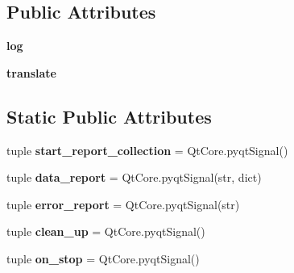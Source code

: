 \subsection*{Public Attributes}
\begin{DoxyCompactItemize}
\item 
\hypertarget{classcommotion__client_1_1extensions_1_1config__editor_1_1main_1_1ViewPort_a24d4aa0a151b0dca094f962f53936c73}{{\bfseries log}}\label{classcommotion__client_1_1extensions_1_1config__editor_1_1main_1_1ViewPort_a24d4aa0a151b0dca094f962f53936c73}

\item 
\hypertarget{classcommotion__client_1_1extensions_1_1config__editor_1_1main_1_1ViewPort_a83f08f61e1a063c32df35a7e1525951b}{{\bfseries translate}}\label{classcommotion__client_1_1extensions_1_1config__editor_1_1main_1_1ViewPort_a83f08f61e1a063c32df35a7e1525951b}

\end{DoxyCompactItemize}
\subsection*{Static Public Attributes}
\begin{DoxyCompactItemize}
\item 
\hypertarget{classcommotion__client_1_1extensions_1_1config__editor_1_1main_1_1ViewPort_a827b09211733037d237a251a8044ace2}{tuple {\bfseries start\-\_\-report\-\_\-collection} = Qt\-Core.\-pyqt\-Signal()}\label{classcommotion__client_1_1extensions_1_1config__editor_1_1main_1_1ViewPort_a827b09211733037d237a251a8044ace2}

\item 
\hypertarget{classcommotion__client_1_1extensions_1_1config__editor_1_1main_1_1ViewPort_acd90e59ae5c48843e70cacebfb578a29}{tuple {\bfseries data\-\_\-report} = Qt\-Core.\-pyqt\-Signal(str, dict)}\label{classcommotion__client_1_1extensions_1_1config__editor_1_1main_1_1ViewPort_acd90e59ae5c48843e70cacebfb578a29}

\item 
\hypertarget{classcommotion__client_1_1extensions_1_1config__editor_1_1main_1_1ViewPort_a56afd31e2d3659d6d6ac0b29368fe4a1}{tuple {\bfseries error\-\_\-report} = Qt\-Core.\-pyqt\-Signal(str)}\label{classcommotion__client_1_1extensions_1_1config__editor_1_1main_1_1ViewPort_a56afd31e2d3659d6d6ac0b29368fe4a1}

\item 
\hypertarget{classcommotion__client_1_1extensions_1_1config__editor_1_1main_1_1ViewPort_a90efecc3e2b13cfd791b7b5b2a48454a}{tuple {\bfseries clean\-\_\-up} = Qt\-Core.\-pyqt\-Signal()}\label{classcommotion__client_1_1extensions_1_1config__editor_1_1main_1_1ViewPort_a90efecc3e2b13cfd791b7b5b2a48454a}

\item 
\hypertarget{classcommotion__client_1_1extensions_1_1config__editor_1_1main_1_1ViewPort_afc73a9eca8862b7826782c586e43a275}{tuple {\bfseries on\-\_\-stop} = Qt\-Core.\-pyqt\-Signal()}\label{classcommotion__client_1_1extensions_1_1config__editor_1_1main_1_1ViewPort_afc73a9eca8862b7826782c586e43a275}

\end{DoxyCompactItemize}


